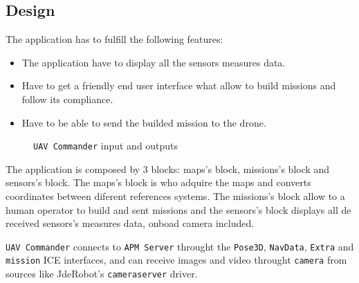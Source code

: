 \documentclass{llncs}
\begin{document}
\subsection{Design}
\label{design}

The application has to fulfill the following features:
\begin{itemize}
\item The application have to display all the sensors measures data.
\item Have to get a friendly end user interface what allow to build missions and follow its compliance.
\item Have to be able to send the builded mission to the drone.
\end{itemize}

\begin{figure}
    \caption{\texttt{UAV Commander} input and outputs}

\end{figure}



The application is composed by 3 blocks: maps's block, missions's block and sensors's block. The maps's block is who adquire the maps and converts coordinates between diferent references systems. The missions's block allow to a human operator to build and sent missions and the sensors's block displays all de received sensors's measures data, onboad camera included.

\texttt{UAV Commander} connects to \texttt{APM Server} throught the  \texttt{Pose3D}, \texttt{NavData}, \texttt{Extra} and \texttt{mission} ICE interfaces, and can receive images and video throught \texttt{camera} from sources like JdeRobot's \texttt{cameraserver} driver.
\end{document}
